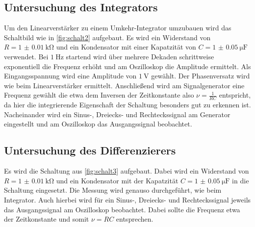 \subsection{Untersuchung des Integrators}
Um den Linearverstärker zu einem Umkehr-Integrator umzubauen %
wird das Schaltbild wie in \autoref{fig:schalt2} aufgebaut.
Es wird ein Widerstand von $R=\qty{1(0.01)}{\kilo\ohm}$ und ein Kondensator mit einer Kapatzität von $C=\qty{1(0.05)}{\micro\farad}$ verwendet.
Bei $\qty{1}{\hertz}$ startend wird über mehrere Dekaden schrittweise exponentiell die Frequenz erhöht und am Oszilloskop die Amplitude ermittelt.
Als Eingangsspannung wird eine Amplitude von $\qty{1}{\volt}$ gewählt.
Der Phasenversatz wird wie beim Linearverstärker ermittelt. 
Anschließend wird am Signalgenerator eine Frequenz gewählt die etwa dem Inversen der Zeitkonstante also $\nu=\frac{1}{RC}$ entspricht, da hier die integrierende Eigenschaft der Schaltung besonders gut zu erkennen ist. 
Nacheinander wird ein Sinus-, Dreiecks- und Rechteckssignal am Generator eingestellt und 
am Oszilloskop das Ausgangssignal beobachtet. 




\subsection{Untersuchung des Differenzierers}
Es wird die Schaltung aus \autoref{fig:schalt3} aufgebaut.
Dabei wird ein Widerstand von $R=\qty{1(0.01)}{\kilo\ohm}$ und ein Kondensator mit der Kapatzität $C=\qty{1(0.05)}{\micro\farad}$ in die Schaltung eingesetzt.
Die Messung wird genauso durchgeführt, wie beim Integrator.
Auch hierbei wird für ein Sinus-, Dreiecks- und Rechteckssignal jeweils das Ausgangssignal am Oszilloskop beobachtet.
Dabei sollte die Frequenz etwa der Zeitkonstante und somit $\nu=RC$ entsprechen.





